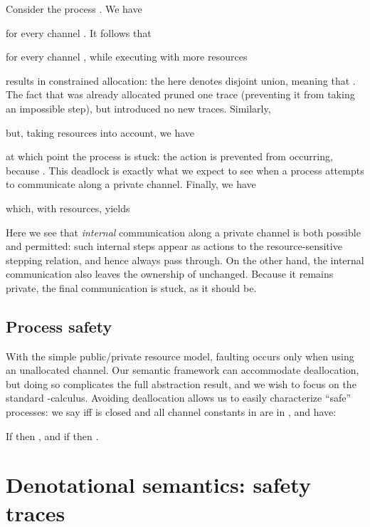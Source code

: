 \documentclass{entcs}
\begin{document}
Consider the process .  We have

for every channel .  It follows that

for every channel , while executing with more resources

results in constrained allocation: the  here denotes disjoint
union, meaning that .  The fact that  was already
allocated pruned one trace (preventing it from taking an impossible
step), but introduced no new traces.  Similarly,

but, taking resources into account, we have

at which point the process is stuck: the action  is prevented
from occurring, because .  This
deadlock is exactly what we expect to see when a process attempts to
communicate along a private channel.  Finally, we have

which, with resources, yields

Here we see that \emph{internal} communication along a private channel
is both possible and permitted: such internal steps appear as 
actions to the resource-sensitive stepping relation, and hence always
pass through.  On the other hand, the internal communication also
leaves the ownership of  unchanged.  Because it remains private,
the final communication  is stuck, as it should be.

\subsection{Process safety}

With the simple public/private resource model, faulting occurs only
when using an unallocated channel.  Our semantic framework can
accommodate deallocation, but doing so complicates the full
abstraction result, and we wish to focus on the standard
-calculus.  Avoiding deallocation allows us to easily
characterize ``safe'' processes: we say  iff 
is closed and all channel constants in  are in , and have:
\begin{lemma}
  If  then
  , and
  if  then .
\end{lemma}














\section{Denotational semantics: safety traces}
\label{sec:safety}
\end{document}
